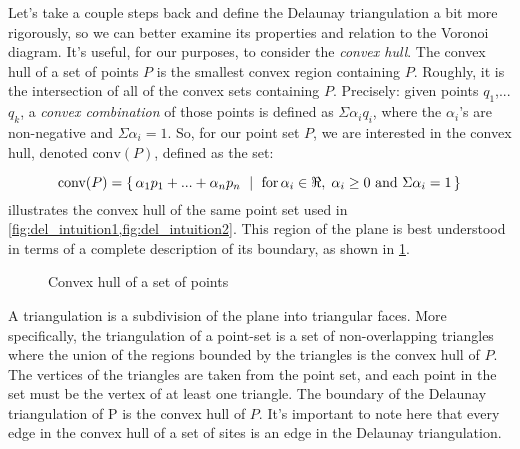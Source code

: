 \documentclass[12pt,twoside]{reedthesis}
\begin{document}

    Let's take a couple steps back and define the Delaunay triangulation a bit more rigorously, so we can better examine its properties and relation to the Voronoi diagram. It's useful, for our purposes, to consider the \emph{convex hull}. The convex hull of a set of points $P$ is the smallest convex region containing $P$. Roughly, it is the intersection of all of the convex sets containing $P$. Precisely: given points $q_{1}$,... $q_{k}$, a \emph{convex combination} of those points is defined as $\Sigma\alpha_{i}q_{i}$, where the $\alpha_{i}$'s are non-negative and $\Sigma\alpha_{i}=1.$  So, for our point set $P$, we are interested in the convex hull, denoted $\mbox{conv}(P)$, defined as the set:


    \[
     \mbox{conv}(P) = \{\, \alpha_{1}p_{1} + ... + \alpha_{n}p_{n} \ \mid\ \text{for$ \,\alpha_{i} \in \Re, \; \alpha_{i} \geq 0$ and $\Sigma\alpha_{i} = 1$}\,\} 
    \]
     illustrates the convex hull of the same point set used in \cref{fig:del_intuition1,fig:del_intuition2}. 
    This region of the plane is best understood in terms of a complete description of its boundary, as shown in \cref{fig:convex_hull}.\par

    \begin{figure}[!htb]
      \centering
      
      \caption{Convex hull of a set of points}
      \label{fig:convex_hull}
    \end{figure}

    A triangulation is a subdivision of the plane into triangular faces. More specifically, the triangulation of a point-set is a set of non-overlapping triangles where the union of the regions bounded by the triangles is the convex hull of $P$. The vertices of the triangles are taken from the point set, and each point in the set must be the vertex of at least one triangle. The boundary of the Delaunay triangulation of P is the convex hull of $P$. It's important to note here that every edge in the convex hull of a set of sites is an edge in the Delaunay triangulation.\par
\end{document}

